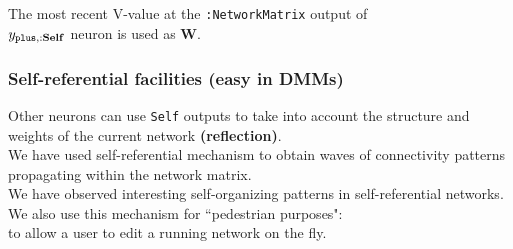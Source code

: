 \documentclass{beamer}
\newcommand{\msblue}[1]{{\color{myblue} #1}}
\newcommand{\msmagenta}[1]{{\color{mymagenta} #1}}
\begin{document}
\begin{frame}

The most recent V-value at the {\footnotesize\tt :NetworkMatrix} output of\\ $y_{{\tt plus}, {\bf :Self}}$ neuron is used as \msblue{\bf W}.


\end{frame}


\begin{frame}

  \frametitle{\msmagenta{Self-referential facilities (easy in DMMs)}}


Other neurons can use {\tt Self} outputs to take into account
the structure and weights of the current network {\bf (reflection)}.\\[2ex]

We have used self-referential mechanism to obtain waves of connectivity
patterns propagating within the network matrix.\\[2ex]

We have observed
interesting self-organizing patterns in self-referential networks.\\[6ex]

We also use this mechanism for ``pedestrian purposes":\\ to allow
a user to edit a running network on the fly.

\end{frame}
\end{document}
